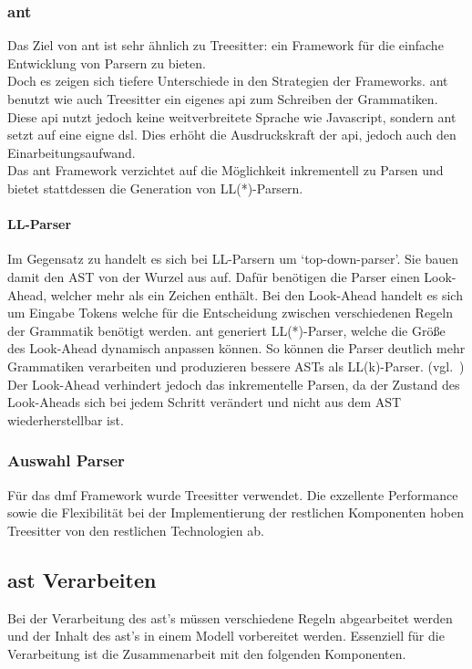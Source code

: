 \documentclass[./einleitung.tex]{subfiles}
\begin{document}
\subsubsection{\acrfull{ant}}
Das Ziel von \acrshort{ant} ist sehr ähnlich zu Treesitter: ein Framework für die einfache Entwicklung von Parsern zu bieten. \\
Doch es zeigen sich tiefere Unterschiede in den Strategien der Frameworks.
\acrshort{ant} benutzt wie auch Treesitter ein eigenes \acrfull{api} zum Schreiben der Grammatiken.
Diese \acrshort{api} nutzt jedoch keine weitverbreitete Sprache wie Javascript, sondern \acrshort{ant} setzt auf eine eigne \acrfull{dsl}.
Dies erhöht die Ausdruckskraft der \acrshort{api}, jedoch auch den Einarbeitungsaufwand.\\
Das \acrshort{ant} Framework verzichtet auf die Möglichkeit inkrementell zu Parsen und bietet stattdessen die Generation von LL(*)-Parsern.

\paragraph{LL-Parser} Im Gegensatz zu  handelt es sich bei LL-Parsern um `top-down-parser'.
Sie bauen damit den AST von der Wurzel aus auf.
Dafür benötigen die Parser einen Look-Ahead, welcher mehr als ein Zeichen enthält.
Bei den Look-Ahead handelt es sich um Eingabe Tokens welche für die Entscheidung zwischen verschiedenen Regeln der Grammatik benötigt werden.
\acrshort{ant} generiert LL(*)-Parser, welche die Größe des Look-Ahead dynamisch anpassen können.
So können die Parser deutlich mehr Grammatiken verarbeiten und produzieren bessere ASTs als LL(k)-Parser. (vgl.~\cite{parr2011ll})
Der Look-Ahead verhindert jedoch das inkrementelle Parsen, da der Zustand des Look-Aheads sich bei jedem Schritt verändert und nicht aus dem AST wiederherstellbar ist.

\subsubsection{Auswahl Parser}
Für das \acrshort{dmf} Framework wurde Treesitter verwendet.
Die exzellente Performance sowie die Flexibilität bei der Implementierung der restlichen Komponenten hoben Treesitter von den restlichen Technologien ab.


\subsection{\acrshort{ast} Verarbeiten}
Bei der Verarbeitung des \acrshort{ast}'s müssen verschiedene Regeln abgearbeitet werden und der Inhalt des \acrshort{ast}'s in einem Modell vorbereitet werden.
Essenziell für die Verarbeitung ist die Zusammenarbeit mit den folgenden Komponenten.
\end{document}
